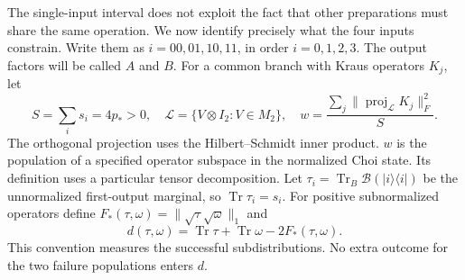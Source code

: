 \documentclass[11pt,letterpaper]{article}
\newcommand{\tr}{\operatorname{Tr}}\newcommand{\TV}{\operatorname{TV}}\newcommand{\E}{\mathbb E}\newcommand{\id}{\mathbb I}\newcommand{\calB}{\mathcal B}\newcommand{\norm}[1]{\left\lVert#1\right\rVert}
\begin{document}
The single-input interval does not exploit the fact that other preparations must share the same operation. We now identify precisely what the four inputs constrain. Write them as $i=00,01,10,11$, in order $i=0,1,2,3$. The output factors will be called $A$ and $B$. For a common branch with Kraus operators $K_j$, let
\[
 S=\sum_i s_i=4p_*>0,\quad
 \mathcal L=\{V\otimes I_2:V\in M_2\},\quad
 w=\frac{\sum_j\|\operatorname{proj}_{\mathcal L} K_j\|_F^2}{S}.
\]
The orthogonal projection uses the Hilbert–Schmidt inner product. $w$ is the population of a specified operator subspace in the normalized Choi state. Its definition uses a particular tensor decomposition. Let $\tau_i=\tr_B\calB(|i\rangle\langle i|)$ be the unnormalized first-output marginal, so $\tr\tau_i=s_i$. For positive subnormalized operators define $F_*(\tau,\omega)=\|\sqrt\tau\sqrt\omega\|_1$ and
\[
 d(\tau,\omega)=\tr\tau+\tr\omega-2F_*(\tau,\omega).
\]
This convention measures the successful subdistributions. No extra outcome for the two failure populations enters $d$.
\end{document}
